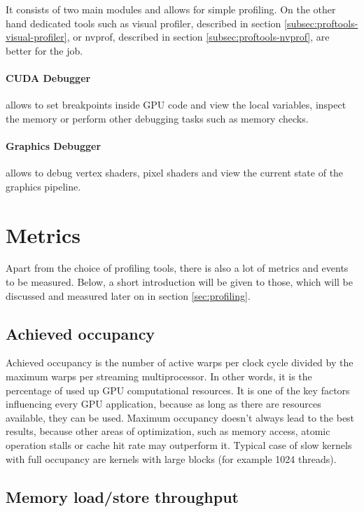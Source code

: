 It consists of two main modules and allows for simple profiling. On the other hand dedicated tools such as visual profiler, described in section \ref{subsec:proftools-visual-profiler}, or nvprof, described in section \ref{subsec:proftools-nvprof}, are better for the job.

\paragraph{CUDA Debugger} allows to set breakpoints inside GPU code and view the local variables, inspect the memory or perform other debugging tasks such as memory checks.

\paragraph{Graphics Debugger} allows to debug vertex shaders, pixel shaders and view the current state of the graphics pipeline.

\section{Metrics}\label{sec:metrics}

Apart from the choice of profiling tools, there is also a lot of metrics and events to be measured. Below, a short introduction will be given to those, which will be discussed and measured later on in section \ref{sec:profiling}.

\subsection{Achieved occupancy}\label{subsec:metrics-achieved-occupancy}

Achieved occupancy is the number of active warps per clock cycle divided by the maximum warps per streaming multiprocessor. In other words, it is the percentage of used up GPU computational resources. It is one of the key factors influencing every GPU application, because as long as there are resources available, they can be used. Maximum occupancy doesn't always lead to the best results, because other areas of optimization, such as memory access, atomic operation stalls or cache hit rate may outperform it. Typical case of slow kernels with full occupancy are kernels with large blocks (for example 1024 threads).

\subsection{Memory load/store throughput}\label{subsec:metrics-memory-throughtput}


